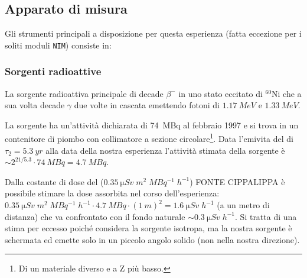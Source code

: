\subsection{Apparato di misura}
Gli strumenti principali a disposizione per questa esperienza (fatta eccezione per i soliti moduli \texttt{NIM}) consiste in:

\subsubsection{Sorgenti radioattive}
La sorgente radioattiva principale di \co\; decade $\beta^-$ in uno stato eccitato di $^{60}$Ni che a sua volta decade $\gamma$ due volte in cascata emettendo fotoni di $\SI{1.17}{MeV}$ e $\SI{1.33}{MeV}$.

La sorgente ha un'attività dichiarata di \SI{74}{MBq} al febbraio 1997 e si trova in un contenitore di piombo con collimatore a sezione circolare\footnote{Di un materiale diverso e a Z più basso.}. 
Data l'emivita del \co\; di $\tau_2 = \SI{5.3}{yr}$ alla data della nostra esperienza l'attività stimata della sorgente è $\sim 2^{21/5.3} \cdot \SI{74}{MBq} = \SI{4.7}{MBq}$.

Dalla costante di dose del \co\;  ($\SI{0.35}{\micro Sv\;m^2\;MBq^{-1}\;h^{-1}}$) FONTE CIPPALIPPA è possibile stimare la dose assorbita nel corso dell'esperienza: $\SI{0.35}{\micro Sv\;m^2\;MBq^{-1}\;h^{-1}} \cdot \SI{4.7}{MBq} \cdot (\SI{1}{m})^2= \SI{1.6}{\micro Sv\;h^{-1}}$ (a un metro di distanza) che va confrontato con il fondo naturale $\sim\SI{0.3}{\micro Sv\;h^{-1}}$. Si tratta di una stima per eccesso poiché considera la sorgente isotropa, ma la nostra sorgente è schermata ed emette solo in un piccolo angolo solido (non nella nostra direzione).


